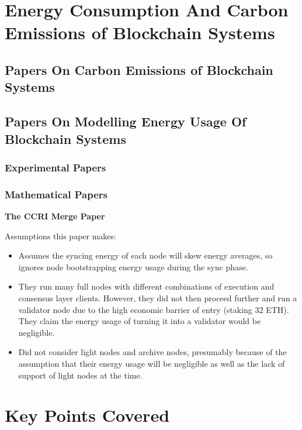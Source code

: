 \section{Energy Consumption And Carbon Emissions of Blockchain Systems}




\subsection{Papers On Carbon Emissions of Blockchain Systems}



\subsection{Papers On Modelling Energy Usage Of Blockchain Systems}



\subsubsection{Experimental Papers}




\subsubsection{Mathematical Papers}




\textbf{The CCRI Merge Paper } \cite{CCRI:Network}

Assumptions this paper makes:
\begin{itemize}
    \item Assumes the syncing energy of each node will skew energy averages, so ignores node bootstrapping energy usage during the sync phase.
    
    \item They run many full nodes with different combinations of execution and consensus layer clients. However, they did not then proceed further and run a validator node due to the high economic barrier of entry (staking 32 ETH). They claim the energy usage of turning it into a validator would be negligible.
    
    \item Did not consider light nodes and archive nodes, presumably because of the assumption that their energy usage will be negligible as well as the lack of support of light nodes at the time.
\end{itemize}





\section{Key Points Covered}
